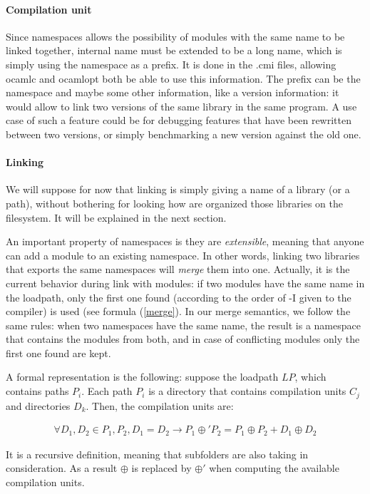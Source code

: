 \documentclass[11pt,a4paper]{article}
\begin{document}
\paragraph{Compilation unit}

Since namespaces allows the possibility of modules with the same name to be
linked together, internal name must be extended to be a long name, which is simply
using the namespace as a prefix. It is done in the .cmi files, allowing ocamlc
and ocamlopt both be able to use this information. The prefix can be the
namespace and maybe some other information, like a version information: it would
allow to link two versions of the same library in the same program. A use case
of such a feature could be for debugging features that have been rewritten
between two versions, or simply benchmarking a new version against the old one.


\paragraph{Linking} We will suppose for now that linking is simply giving a name
of a library (or a path), without bothering for looking how are organized those
libraries on the filesystem. It will be explained in the next section.

An important property of namespaces is they are \emph{extensible}, meaning that
anyone can add a module to an existing namespace. In other words, linking two
libraries that exports the same namespaces will \emph{merge} them into
one. Actually, it is the current behavior during link with modules: if two
modules have the same name in the loadpath, only the first one found (according
to the order of -I given to the compiler) is used (see formula (\ref{merge}). In
our merge semantics, we follow the same rules: when two namespaces have the same
name, the result is a namespace that contains the modules from both, and in case
of conflicting modules only the first one found are kept.

A formal representation is the following: suppose the loadpath $LP$, which
contains paths $P_i$. Each path $P_i$ is a directory that contains compilation
units $C_j$ and directories $D_k$. Then, the compilation units are:

\begin{multline}
\forall D_1, D_2 \in P_1, P_2, D_1 = D_2
\rightarrow P_1 \oplus' P_2 = P_1 \oplus P_2 + D_1 \oplus D_2
\label{ns-merge} 
\end{multline}

It is a recursive definition, meaning that subfolders are also taking in
consideration. As a result $\oplus$ is replaced by $\oplus'$ when computing the
available compilation units.
\end{document}
